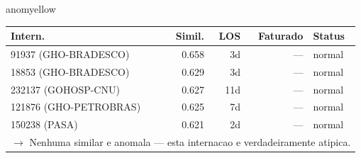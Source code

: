 \documentclass[a4paper,10pt]{article}
\begin{document}
\begin{anomalycard}[Internacao 150453 | GHO-PETROBRAS | MODERADO (z=2.14)]{anomyellow}
\begin{tabular}{l r r r l}\toprule\textbf{Intern.} & \textbf{Simil.} & \textbf{LOS} & \textbf{Faturado} & \textbf{Status} \\\midrule
91937 (GHO-BRADESCO) & 0.658 & 3d & --- & \textcolor{jcubeblue}{normal} \\
18853 (GHO-BRADESCO) & 0.629 & 3d & --- & \textcolor{jcubeblue}{normal} \\
232137 (GOHOSP-CNU) & 0.627 & 11d & --- & \textcolor{jcubeblue}{normal} \\
121876 (GHO-PETROBRAS) & 0.625 & 7d & --- & \textcolor{jcubeblue}{normal} \\
150238 (PASA) & 0.621 & 2d & --- & \textcolor{jcubeblue}{normal} \\
\multicolumn{5}{l}{\textcolor{jcubeblue}{\small $\rightarrow$ Nenhuma similar e anomala --- esta internacao e verdadeiramente atipica.}} \\
\bottomrule\end{tabular}


\end{anomalycard}

\newpage
\end{document}

